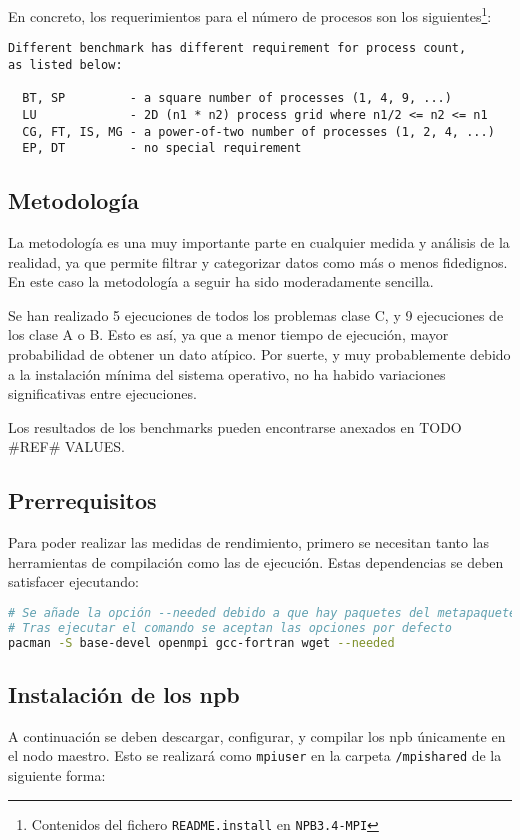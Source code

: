 En concreto, los requerimientos para el número de procesos son los siguientes\footnote{Contenidos del fichero \texttt{README.install} en \texttt{NPB3.4-MPI}}:

\begin{lstlisting}
Different benchmark has different requirement for process count,
as listed below:

  BT, SP         - a square number of processes (1, 4, 9, ...)
  LU             - 2D (n1 * n2) process grid where n1/2 <= n2 <= n1
  CG, FT, IS, MG - a power-of-two number of processes (1, 2, 4, ...)
  EP, DT         - no special requirement
\end{lstlisting}

\subsection{Metodología}
La metodología es una muy importante parte en cualquier medida y análisis de la realidad, ya que permite filtrar y categorizar datos como más o menos fidedignos. En este caso la metodología a seguir ha sido moderadamente sencilla.

Se han realizado 5 ejecuciones de todos los problemas clase C, y 9 ejecuciones de los clase A o B. Esto es así, ya que a menor tiempo de ejecución, mayor probabilidad de obtener un dato atípico. Por suerte, y muy probablemente debido a la instalación mínima del sistema operativo, no ha habido variaciones significativas entre ejecuciones.

Los resultados de los benchmarks pueden encontrarse anexados en TODO \#REF\# VALUES.

\subsection{Prerrequisitos}
Para poder realizar las medidas de rendimiento, primero se necesitan tanto las herramientas de compilación como las de ejecución. Estas dependencias se deben satisfacer ejecutando:

\begin{lstlisting}[language=bash]
# Se añade la opción --needed debido a que hay paquetes del metapaquete base-devel que ya están instalados, y no es necesario reinstalar.
# Tras ejecutar el comando se aceptan las opciones por defecto
pacman -S base-devel openmpi gcc-fortran wget --needed
\end{lstlisting}

\subsection{Instalación de los \acrshort{npb}}
A continuación se deben descargar, configurar, y compilar los \acrlong{npb} únicamente en el nodo maestro. Esto se realizará como \texttt{mpiuser} en la carpeta \texttt{/mpishared} de la siguiente forma:


